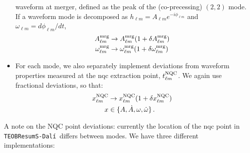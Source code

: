 \documentclass[prd,amssymb,amsmath,amsfonts,nofootinbib,reprint,showpacs,longbibliography]{revtex4-1}
\def\TEOBResumSDali{\texttt{TEOBResumS-Dalí}}
\begin{document}
\begin{itemize}
waveform at merger, defined as the peak of the (co-precessing) $(2,2)$ mode. If a waveform mode is decomposed
as $h_{\ell m} = A_{\ell m} e^{-i \phi_{\ell m}}$ and $\omega_{\ell m} = d\phi_{\ell m}/dt$,
\begin{subequations}
\begin{align}
A_{\ell m}^{\rm mrg} &\rightarrow A_{\ell m}^{\rm mrg} (1 + \delta A_{\ell m}^{\rm mrg}) \\
\omega_{\ell m}^{\rm mrg} &\rightarrow \omega_{\ell m}^{\rm mrg} (1 + \delta \omega_{\ell m}^{\rm mrg})
\end{align}
\end{subequations}
%
\item For each mode, we also separately implement deviations from waveform properties measured at the \ac{nqc}
extraction point, $t_{\ell m}^{\rm NQC}$. We again use fractional deviations, so that:
\begin{subequations}
\begin{align}
x_{\ell m}^{\rm NQC} &\rightarrow x_{\ell m}^{\rm NQC} (1 + \delta x_{\ell m}^{\rm NQC}) \\
x &\in \{A, \dot{A}, \omega, \dot{\omega}\} \, .
\end{align}
\end{subequations}
\end{itemize}
%
A note on the NQC point deviations: currently the location of the \ac{nqc} point in \TEOBResumSDali~differs between modes. 
We have three different implementations:
\end{document}
